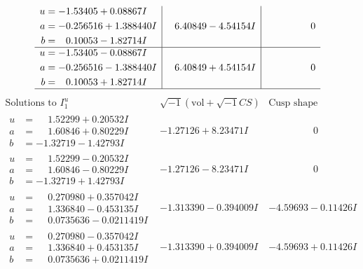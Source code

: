 \documentclass[1p]{elsarticle_modified}
\theoremstyle{definition}
\newcommand{\I}{\sqrt{-1}}
\begin{document}
$$\begin{array}{c|c|c}
\begin{aligned}
u &= -1.53405 + 0.08867 I \\
a &= -0.256516 + 1.388440 I \\
b &= \phantom{-}0.10053 - 1.82714 I\end{aligned}
 & \phantom{-}6.40849 - 4.54154 I & \phantom{-0.000000 } 0 \\ \hline\begin{aligned}
u &= -1.53405 - 0.08867 I \\
a &= -0.256516 - 1.388440 I \\
b &= \phantom{-}0.10053 + 1.82714 I\end{aligned}
 & \phantom{-}6.40849 + 4.54154 I & \phantom{-0.000000 } 0\\
 \hline 
 \end{array}$$\newpage$$\begin{array}{c|c|c}  
\text{Solutions to }I^u_{1}& \I (\text{vol} + \sqrt{-1}CS) & \text{Cusp shape}\\
 \hline 
\begin{aligned}
u &= \phantom{-}1.52299 + 0.20532 I \\
a &= \phantom{-}1.60846 + 0.80229 I \\
b &= -1.32719 - 1.42793 I\end{aligned}
 & -1.27126 + 8.23471 I & \phantom{-0.000000 } 0 \\ \hline\begin{aligned}
u &= \phantom{-}1.52299 - 0.20532 I \\
a &= \phantom{-}1.60846 - 0.80229 I \\
b &= -1.32719 + 1.42793 I\end{aligned}
 & -1.27126 - 8.23471 I & \phantom{-0.000000 } 0 \\ \hline\begin{aligned}
u &= \phantom{-}0.270980 + 0.357042 I \\
a &= \phantom{-}1.336840 - 0.453135 I \\
b &= \phantom{-}0.0735636 - 0.0211419 I\end{aligned}
 & -1.313390 - 0.394009 I & -4.59693 - 0.11426 I \\ \hline\begin{aligned}
u &= \phantom{-}0.270980 - 0.357042 I \\
a &= \phantom{-}1.336840 + 0.453135 I \\
b &= \phantom{-}0.0735636 + 0.0211419 I\end{aligned}
 & -1.313390 + 0.394009 I & -4.59693 + 0.11426 I \\ \hline\begin{aligned}

\end{aligned}
\end{array}$$
\end{document}
